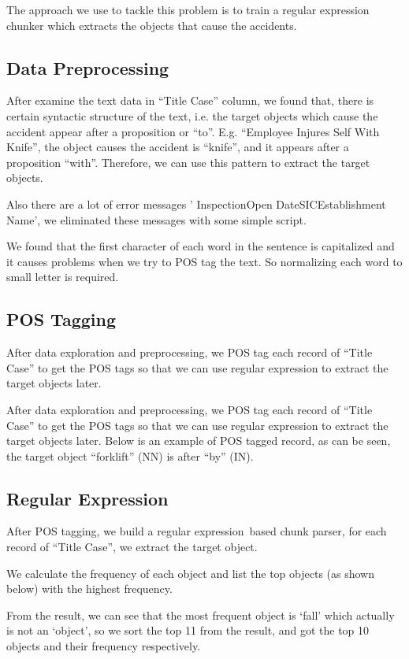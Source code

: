 \documentclass[DIV=calc, paper=a4, fontsize=11pt, twocolumn]{scrartcl}	 %
\begin{document}
The approach we use to tackle this problem is to train a regular
expression chunker which extracts the objects that cause the
accidents.

\subsection{Data Preprocessing}
After examine the text data in “Title Case” column, we found that,
there is certain syntactic structure of the text, i.e. the target
objects which cause the accident appear after a proposition or
“to”. E.g. “Employee Injures Self With Knife”, the object causes the
accident is “knife”, and it appears after a proposition
“with”. Therefore, we can use this pattern to extract the target
objects.

Also there are a lot of error messages ' InspectionOpen
DateSICEstablishment Name', we eliminated these messages with some
simple script.

We found that the first character of each word in the sentence is
capitalized and it causes problems when we try to POS tag the text. So
normalizing each word to small letter is required.


\subsection{POS Tagging}
After data exploration and preprocessing, we POS tag each record of
“Title Case” to get the POS tags so that we can use regular expression
to extract the target objects later.

After data exploration and preprocessing, we POS tag each record of
“Title Case” to get the POS tags so that we can use regular expression
to extract the target objects later. Below is an example of POS tagged
record, as can be seen, the target object “forklift” (NN) is after
“by” (IN).


\subsection{Regular Expression}
After POS tagging, we build a regular expression based chunk parser,
for each record of “Title Case”, we extract the target object.

We calculate the frequency of each object and list the top objects
(as shown below) with the highest frequency.

From the result, we can see that the most frequent object is ‘fall’
which actually is not an ‘object’, so we sort the top 11 from the
result, and got the top 10 objects and their frequency respectively.
\end{document}
